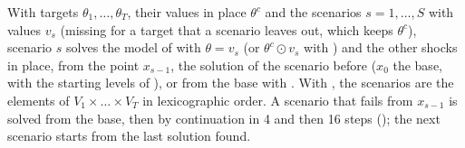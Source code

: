 
With targets $\theta_1, \dots, \theta_T$, their values in place $\theta^c$ and
the scenarios $s = 1, \dots, S$ with values $v_{s}$ (missing for a target that a
scenario leaves out, which keeps $\theta^c$), scenario $s$ solves the model of
 with $\theta = v_s$ (or $\theta^c \odot v_s$ with
) and the other shocks in place, from the point $x_{s-1}$, the
solution of the scenario before ($x_0$ the base, with the starting levels of
), or from the base with . With ,
the scenarios are the elements of $V_1 \times \dots \times V_T$ in
lexicographic order. A scenario that fails from $x_{s-1}$ is solved from the
base, then by continuation in 4 and then 16 steps (); the
next scenario starts from the last solution found.


\begin{alsosee}
\end{alsosee}
